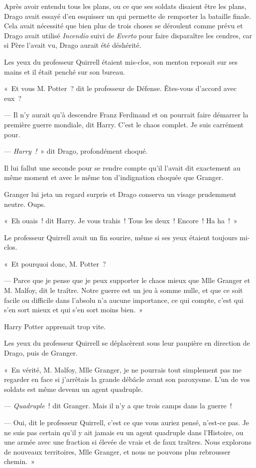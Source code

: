 Après avoir entendu tous les plans, ou ce que ses soldats disaient être les plans, Drago avait essayé d'en esquisser un qui permette de remporter la bataille finale.
Cela avait nécessité que bien plus de trois choses se déroulent comme prévu et Drago avait utilisé \emph{Incendio} suivi de \emph{Everto} pour faire disparaître les cendres, car si Père l'avait vu, Drago aurait été déshérité.

Les yeux du professeur Quirrell étaient mis-clos, son menton reposait sur ses mains et il était penché sur son bureau.

«~Et vous M. Potter~? dit le professeur de Défense.
Êtes-vous d'accord avec eux~?

--- Il n'y aurait qu'à descendre Franz Ferdinand et on pourrait faire démarrer la première guerre mondiale, dit Harry.
C'est le chaos complet.
Je suis carrément pour.

--- \emph{Harry~!}~» dit Drago, profondément choqué.

Il lui fallut une seconde pour se rendre compte qu'il l'avait dit exactement au même moment et avec le même ton d'indignation choquée que Granger.

Granger lui jeta un regard surpris et Drago conserva un visage prudemment neutre.
Oups.

«~Eh ouais~! dit Harry.
Je vous trahis~!
Tous les deux~!
Encore~!
Ha ha~!~»

Le professeur Quirrell avait un fin sourire, même si ses yeux étaient toujours mi-clos.

«~Et pourquoi donc, M. Potter~?

--- Parce que je pense que je peux supporter le chaos mieux que Mlle Granger et M. Malfoy, dit le traître.
Notre guerre est un jeu à somme nulle, et que ce soit facile ou difficile dans l'absolu n'a aucune importance, ce qui compte, c'est qui s'en sort mieux et qui s'en sort moins bien.~»

Harry Potter apprenait trop vite.

Les yeux du professeur Quirrell se déplacèrent sous leur paupière en direction de Drago, puis de Granger.

«~En vérité, M. Malfoy, Mlle Granger, je ne pourrais tout simplement pas me regarder en face si j'arrêtais la grande débâcle avant son paroxysme.
L'un de vos soldats est même devenu un agent quadruple.

--- \emph{Quadruple}~! dit Granger.
Mais il n'y a que trois camps dans la guerre~!

--- Oui, dit le professeur Quirrell, c'est ce que vous auriez pensé, n'est-ce pas.
Je ne suis pas certain qu'il y ait jamais eu un agent quadruple dans l'Histoire, ou une armée avec une fraction si élevée de vrais et de faux traîtres.
Nous explorons de nouveaux territoires, Mlle Granger, et nous ne pouvons plus rebrousser chemin.~»

